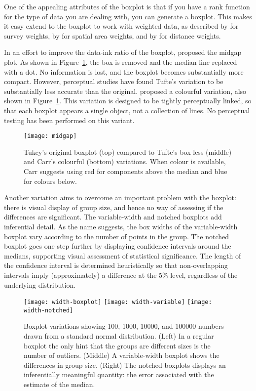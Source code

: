 \documentclass[oneside]{article}
\begin{document}
One of the appealing attributes of the boxplot is that if you have a rank function for the type of data you are dealing with, you can generate a boxplot. This makes it easy extend to the boxplot to work with weighted data, as described by \citet{survey,korn:1998} for survey weights, by \citet{willmott:2007} for spatial area weights, and by \citet{dykes:2007} for distance weights.

In an effort to improve the data-ink ratio of the boxplot, \citep{tufte:2001} proposed the midgap plot. As shown in Figure~\ref{fig:tufte}, the box is removed and the median line replaced with a dot. No information is lost, and the boxplot becomes substantially more compact. However, perceptual studies \citep{stock:1991} have found Tufte's variation to be substantially less accurate than the original. \citet{carr:1994a} proposed a colourful variation, also shown in Figure~\ref{fig:tufte}. This variation is designed to be tightly perceptually linked, so that each boxplot appears a single object, not a collection of lines. No perceptual testing has been performed on this variant.

\begin{figure}[htbp]
  \centering
  \texttt{[image: midgap]}
  \caption{Tukey's original boxplot (top) compared to Tufte's box-less (middle) and Carr's colourful (bottom) variations. When colour is available, Carr suggests using red for components above the median and blue for colours below.}
  \label{fig:tufte}
\end{figure}

Another variation aims to overcome an important problem with the boxplot: there is visual display of group size, and hence no way of assessing if the differences are significant. The variable-width and notched boxplots \citep{mcgill:1978} add inferential detail. As the name suggests, the box widths of the variable-width boxplot vary according to the number of points in the group. The notched boxplot goes one step further by displaying confidence intervals around the medians, supporting visual assessment of statistical significance. The length of the confidence interval is determined heuristically so that non-overlapping intervals imply (approximately) a difference at the 5\% level, regardless of the underlying distribution.

\begin{figure}[htbp]
  \centering
  \texttt{[image: width-boxplot]}%
  \texttt{[image: width-variable]}%
  \texttt{[image: width-notched]}
  \caption{Boxplot variations showing 100, 1000, 10000, and 100000 numbers drawn from a standard normal distribution.  (Left) In a regular boxplot the only hint that the groups are different sizes is the number of outliers. (Middle) A variable-width boxplot shows the differences in group size.  (Right) The notched boxplots displays an inferentially meaningful quantity: the error associated with the estimate of the median.}
  \label{fig:width}
\end{figure}
\end{document}
